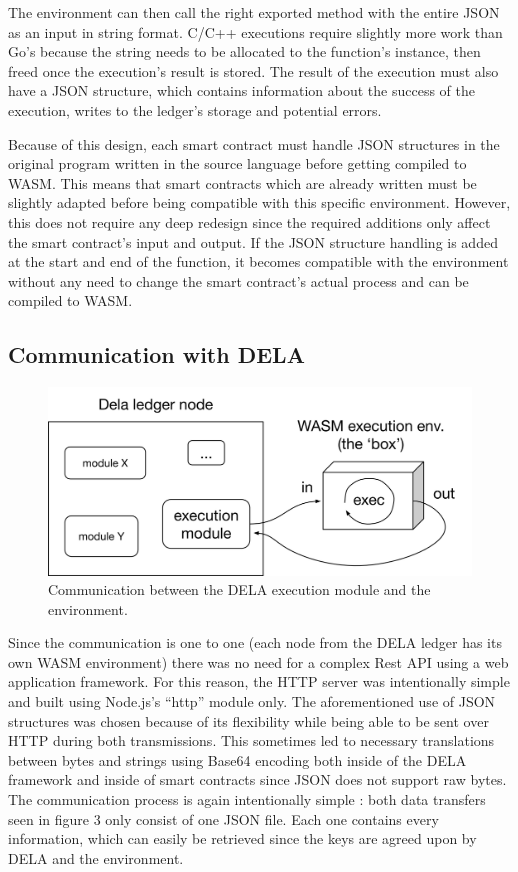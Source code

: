 \documentclass[11pt, a4paper, twoside, openright]{article}
\begin{document}
The environment can then call the right exported method with the entire JSON as an input in string format. C/C++ executions require slightly more work than Go's because the string needs to be allocated to the function's instance, then freed once the execution's result is stored. The result of the execution must also have a JSON structure, which contains information about the success of the execution, writes to the ledger's storage and potential errors.

Because of this design, each smart contract must handle JSON structures in the original program written in the source language before getting compiled to WASM. This means that smart contracts which are already written must be slightly adapted before being compatible with this specific environment. However, this does not require any deep redesign since the required additions only affect the smart contract's input and output. If the JSON structure handling is added at the start and end of the function, it becomes compatible with the environment without any need to change the smart contract's actual process and can be compiled to WASM.

\subsection{Communication with DELA}

\begin{figure}[htbp]
 \centering
  \includegraphics[width=12cm]{wasm3.png}
  \caption{Communication between the DELA execution module and the environment.}
\end{figure}

Since the communication is one to one (each node from the DELA ledger has its own WASM environment) there was no need for a complex Rest API using a web application framework. For this reason, the HTTP server was intentionally simple and built using Node.js's ``http'' module only. The aforementioned use of JSON structures was chosen because of its flexibility while being able to be sent over HTTP during both transmissions. This sometimes led to necessary translations between bytes and strings using Base64 encoding both inside of the DELA framework and inside of smart contracts since JSON does not support raw bytes. The communication process is again intentionally simple : both data transfers seen in figure 3 only consist of one JSON file. Each one contains every information, which can easily be retrieved since the keys are agreed upon by DELA and the environment.
\end{document}

